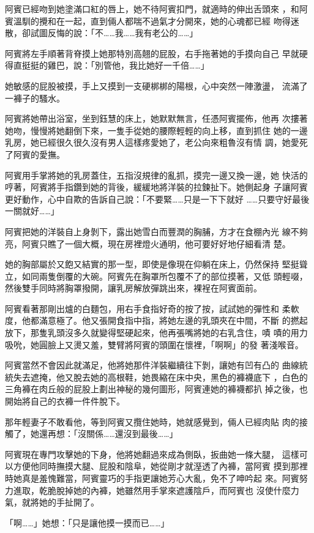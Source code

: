 阿賓已經吻到她塗滿口紅的唇上，她不待阿賓扣門，就適時的伸出舌頭來
，和阿賓溫馴的攪和在一起，直到倆人都喘不過氣才分開來，她的心魂都已經
吻得迷散，卻試圖反悔的說：「不……我……我有老公的……」

阿賓將左手順著背脊摸上她那特別高翹的屁股，右手拖著她的手摸向自己
早就硬得直挺挺的雞巴，說：「別管他，我比她好一千倍……」

她敏感的屁股被摸，手上又摸到一支硬梆梆的陽根，心中突然一陣激盪，
流滿了一褲子的騷水。

阿賓將她帶出浴室，坐到鈺慧的床上，她默默無言，任憑阿賓擺佈，他再
次摟著她吻，慢慢將她翻倒下來，一隻手從她的腰際輕輕的向上移，直到抓住
她的一邊乳房，她已經很久很久沒有男人這樣疼愛她了，老公向來粗魯沒有情
調，她愛死了阿賓的愛撫。

阿賓用手掌將她的乳房蓋住，五指沒規律的亂抓，摸完一邊又換一邊，她
快活的哼著，阿賓將手指鑽到她的背後，緩緩地將洋裝的拉鍊扯下。她側起身
子讓阿賓更好動作，心中自欺的告訴自己說：「不要緊……只是一下下就好
……只要守好最後一關就好……」

阿賓把她的洋裝自上身剝下，露出她雪白而豐潤的胸脯，方才在食棚內光
線不夠亮，阿賓只瞧了一個大概，現在房裡燈火通明，他可要好好地仔細看清
楚。

她的胸部屬於又飽又結實的那一型，即使是像現在仰躺在床上，仍然保持
堅挺聳立，如同兩隻倒覆的大碗。阿賓先在胸罩所包覆不了的部位摸著，又低
頭輕啜，然後雙手同時將胸罩撥開，讓乳房解放彈跳出來，裸裎在阿賓面前。

阿賓看著那剛出爐的白麵包，用右手食指好奇的按了按，試試她的彈性和
柔軟度，他都滿意極了。他又張開食指中指，將她左邊的乳頭夾在中間，不斷
的撚起放下，那隻乳頭沒多久就變得堅硬起來，他再張嘴將她的右乳含住，嘖
嘖的用力吸吮，她圓臉上又燙又羞，雙臂將阿賓的頭圍在懷裡，「啊啊」的發
著淺喉音。

阿賓當然不會因此就滿足，他將她那件洋裝繼續往下剝，讓她有凹有凸的
曲線統統失去遮掩，他又脫去她的高根鞋，她畏縮在床中央，黑色的褲襪底下
，白色的三角褲在肉丘般的屁股上劃出神秘的幾何圖形，阿賓連她的褲襪都扒
掉之後，也開始將自己的衣褲一件件脫下。

那年輕妻子不敢看他，等到阿賓又攬住她時，她就感覺到，倆人已經肉貼
肉的接觸了，她還再想：「沒關係……還沒到最後……」

阿賓現在專門攻擊她的下身，他將她翻過來成為側臥，扳曲她一條大腿，
這樣可以方便他同時撫摸大腿、屁股和陰阜，她從剛才就溼透了內褲，當阿賓
摸到那裡時她真是羞愧難當，阿賓靈巧的手指更讓她芳心大亂，免不了呻吟起
來。阿賓努力進取，乾脆脫掉她的內褲，她雖然用手掌來遮護陰戶，而阿賓也
沒使什麼力氣，就將她的手扯開了。

「啊……」她想：「只是讓他摸一摸而已……」

